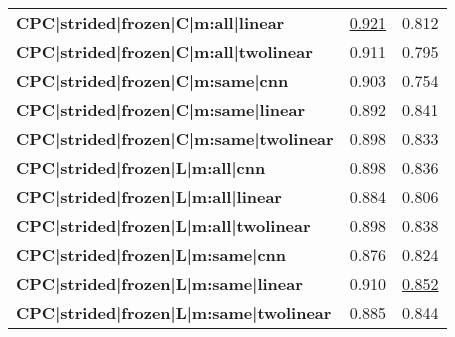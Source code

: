 \begin{adjustbox}{width=\textwidth}
\begin{tabular}{lrr}
\textbf{CPC|strided|frozen|C|m:all|linear      } &  \underline{0.921} &  0.812 \\
\textbf{CPC|strided|frozen|C|m:all|twolinear     } &  0.911 &  0.795 \\
\textbf{CPC|strided|frozen|C|m:same|cnn          } &  0.903 &  0.754 \\
\textbf{CPC|strided|frozen|C|m:same|linear     } &  0.892 &  0.841 \\
\textbf{CPC|strided|frozen|C|m:same|twolinear    } &  0.898 &  0.833 \\
\textbf{CPC|strided|frozen|L|m:all|cnn           } &  0.898 &  0.836 \\
\textbf{CPC|strided|frozen|L|m:all|linear      } &  0.884 &  0.806 \\
\textbf{CPC|strided|frozen|L|m:all|twolinear     } &  0.898 &  0.838 \\
\textbf{CPC|strided|frozen|L|m:same|cnn          } &  0.876 &  0.824 \\
\textbf{CPC|strided|frozen|L|m:same|linear     } &  0.910 &  \underline{0.852} \\
\textbf{CPC|strided|frozen|L|m:same|twolinear    } &  0.885 &  0.844 \\
\bottomrule
\end{tabular}
\end{adjustbox}